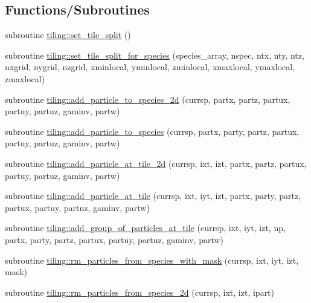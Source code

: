\subsection*{Functions/\+Subroutines}
\begin{DoxyCompactItemize}
\item 
subroutine \hyperlink{namespacetiling_ae08843ba623397e395f3cdc2e10ffc12}{tiling\+::set\+\_\+tile\+\_\+split} ()
\item 
subroutine \hyperlink{namespacetiling_a57bd64d1c926175fa558ed14e0a9f395}{tiling\+::set\+\_\+tile\+\_\+split\+\_\+for\+\_\+species} (species\+\_\+array, nspec, ntx, nty, ntz, nxgrid, nygrid, nzgrid,                   xminlocal, yminlocal, zminlocal, xmaxlocal, ymaxlocal, zmaxlocal)
\item 
subroutine \hyperlink{namespacetiling_a6d78403de2ce67688301c28455638363}{tiling\+::add\+\_\+particle\+\_\+to\+\_\+species\+\_\+2d} (currsp, partx, partz,                                                       partux, partuy, partuz, gaminv, partw)
\item 
subroutine \hyperlink{namespacetiling_a4aaddc2230da22ad8bf1bb439f24b3ee}{tiling\+::add\+\_\+particle\+\_\+to\+\_\+species} (currsp, partx, party, partz,                                                       partux, partuy, partuz, gaminv, partw)
\item 
subroutine \hyperlink{namespacetiling_acd2c914a7012265a66a69aedbb714ab9}{tiling\+::add\+\_\+particle\+\_\+at\+\_\+tile\+\_\+2d} (currsp, ixt, izt, partx, partz,                                                           partux, partuy, partuz, gaminv, partw)
\item 
subroutine \hyperlink{namespacetiling_a359fbc74072f7cc701885efa8440a648}{tiling\+::add\+\_\+particle\+\_\+at\+\_\+tile} (currsp, ixt, iyt, izt, partx, party, partz,                                                           partux, partuy, partuz, gaminv, partw)
\item 
subroutine \hyperlink{namespacetiling_a95ecc37c280961f5c094916b0fbf9724}{tiling\+::add\+\_\+group\+\_\+of\+\_\+particles\+\_\+at\+\_\+tile} (currsp, ixt, iyt, izt, np, partx, party,                                           partz, partux, partuy, partuz, gaminv, partw)
\item 
subroutine \hyperlink{namespacetiling_ad4f03c522071b6b40bc01c16b5aa1bdd}{tiling\+::rm\+\_\+particles\+\_\+from\+\_\+species\+\_\+with\+\_\+mask} (currsp, ixt, iyt, izt, mask)
\item 
subroutine \hyperlink{namespacetiling_a837e4ff4ce81c945e94ea975a1df6fc1}{tiling\+::rm\+\_\+particles\+\_\+from\+\_\+species\+\_\+2d} (currsp, ixt, izt, ipart)

\end{DoxyCompactItemize}
